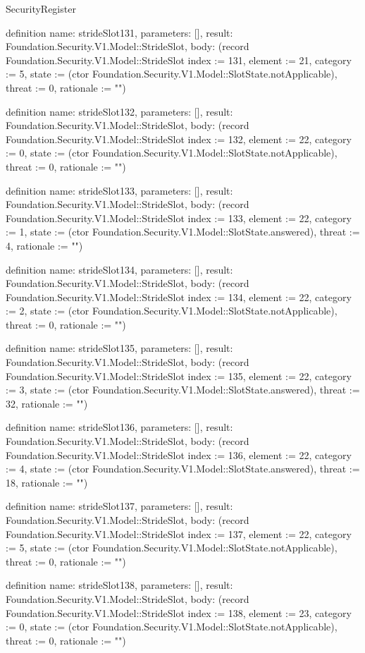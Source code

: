 \begin{lexlean}{SecurityRegister}
\begin{semanticmodule}
definition{
  name: strideSlot131,
  parameters: [],
  result: Foundation.Security.V1.Model::StrideSlot,
  body: (record Foundation.Security.V1.Model::StrideSlot {index := 131, element := 21, category := 5, state := (ctor Foundation.Security.V1.Model::SlotState.notApplicable), threat := 0, rationale := ""})
}

definition{
  name: strideSlot132,
  parameters: [],
  result: Foundation.Security.V1.Model::StrideSlot,
  body: (record Foundation.Security.V1.Model::StrideSlot {index := 132, element := 22, category := 0, state := (ctor Foundation.Security.V1.Model::SlotState.notApplicable), threat := 0, rationale := ""})
}

definition{
  name: strideSlot133,
  parameters: [],
  result: Foundation.Security.V1.Model::StrideSlot,
  body: (record Foundation.Security.V1.Model::StrideSlot {index := 133, element := 22, category := 1, state := (ctor Foundation.Security.V1.Model::SlotState.answered), threat := 4, rationale := ""})
}

definition{
  name: strideSlot134,
  parameters: [],
  result: Foundation.Security.V1.Model::StrideSlot,
  body: (record Foundation.Security.V1.Model::StrideSlot {index := 134, element := 22, category := 2, state := (ctor Foundation.Security.V1.Model::SlotState.notApplicable), threat := 0, rationale := ""})
}

definition{
  name: strideSlot135,
  parameters: [],
  result: Foundation.Security.V1.Model::StrideSlot,
  body: (record Foundation.Security.V1.Model::StrideSlot {index := 135, element := 22, category := 3, state := (ctor Foundation.Security.V1.Model::SlotState.answered), threat := 32, rationale := ""})
}

definition{
  name: strideSlot136,
  parameters: [],
  result: Foundation.Security.V1.Model::StrideSlot,
  body: (record Foundation.Security.V1.Model::StrideSlot {index := 136, element := 22, category := 4, state := (ctor Foundation.Security.V1.Model::SlotState.answered), threat := 18, rationale := ""})
}

definition{
  name: strideSlot137,
  parameters: [],
  result: Foundation.Security.V1.Model::StrideSlot,
  body: (record Foundation.Security.V1.Model::StrideSlot {index := 137, element := 22, category := 5, state := (ctor Foundation.Security.V1.Model::SlotState.notApplicable), threat := 0, rationale := ""})
}

definition{
  name: strideSlot138,
  parameters: [],
  result: Foundation.Security.V1.Model::StrideSlot,
  body: (record Foundation.Security.V1.Model::StrideSlot {index := 138, element := 23, category := 0, state := (ctor Foundation.Security.V1.Model::SlotState.notApplicable), threat := 0, rationale := ""})
}


\end{semanticmodule}
\end{lexlean}
